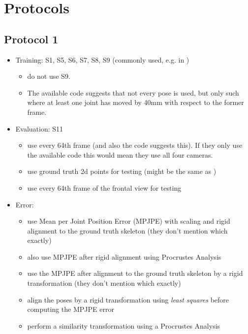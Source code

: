 
\section{Protocols}
\subsection{Protocol 1}
	\begin{itemize}
		\item Training: S1, S5, S6, S7, S8, S9 (commonly used, e.g. in \cite{chen17})
		\begin{itemize}
			\item \cite{drover18} do not use S9.
			\item The available code suggests that not every pose is used, but only such where at least one joint has moved by 40mm with respect to the former frame.
		\end{itemize} 			
		\item Evaluation: S11
		\begin{itemize}
			\item \cite{sun17} use every 64th frame (and also the code suggests this). If they only use the available code this would mean they use all four cameras.
			\item \cite{drover18} use ground truth 2d points for testing (might be the same as \cite{sun17})
			\item \cite{moreno-noguer16} use every 64th frame of the frontal view for testing
		\end{itemize}

		\item Error: \begin{itemize}
			\item \cite{drover18} use Mean per Joint Position Error (MPJPE) with scaling and rigid alignment to the ground truth skeleton (they don't mention which exactly)
			\item \cite{sun17} also use MPJPE after rigid alignment using Procrustes Analysis
			\item \cite{yasin16} use the MPJPE after alignment to the ground truth skeleton by a rigid transformation (they don't mention which exactly)
			\item \cite{kostrikov14} align the poses by a rigid transformation using \emph{least squares} before computing the MPJPE error
			\item \cite{tome17} perform a similarity transformation using a Procrustes Analysis
		\end{itemize}
		
	\end{itemize}
